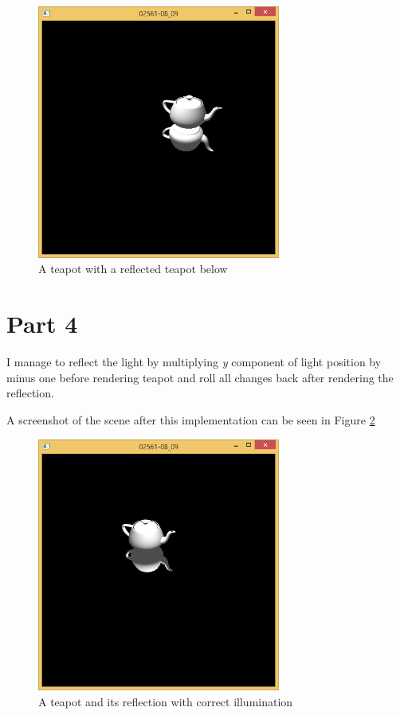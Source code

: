 \begin{figure}[hp]
\centering
\includegraphics[width=8cm]{../Screenshots/ex-9b/3.png}
\caption{A teapot with a reflected teapot below}
\label{fig:9-3}
\end{figure}

\section{Part 4}

I manage to reflect the light by multiplying \emph{y} component of light position by minus one before rendering teapot and roll all changes back after rendering the reflection.

A screenshot of the scene after this implementation can be seen in Figure \ref{fig:9-4}

\begin{figure}[hp]
\centering
\includegraphics[width=8cm]{../Screenshots/ex-9b/4.png}
\caption{A teapot and its reflection with correct illumination}
\label{fig:9-4}
\end{figure}



